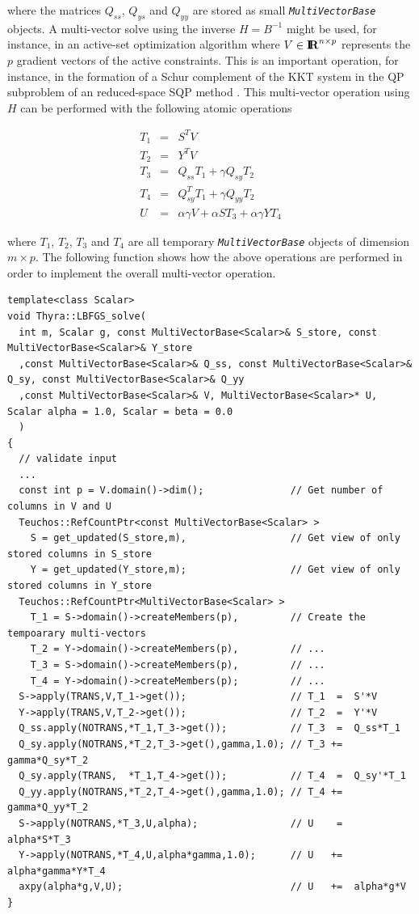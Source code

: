 \documentclass[pdf,ps2pdf,11pt]{SANDreport}
\begin{document}
where the matrices $Q_{ss}$, $Q_{ys}$ and $Q_{yy}$ are stored as small
{}\texttt{\textit{Multi\-Vector\-Base}} objects.  A multi-vector solve using
the inverse $H = B^{-1}$ might be used, for instance, in an active-set
optimization algorithm where $V\in\mbox{\textbf{I}}\hspace{-0.6ex}\mbox{\textbf{R}}^{n \times p}$ represents the $p$
gradient vectors of the active constraints.  This is an important
operation, for instance, in the formation of a Schur complement of the
KKT system in the QP subproblem of an reduced-space SQP method
{}\cite{RABartlett_2001}.  This multi-vector operation using $H$ can
be performed with the following atomic operations

\begin{eqnarray*}
T_1 & = & S^T V \\
T_2 & = & Y^T V \\
T_3 & = & Q_{ss} T_1 + \gamma Q_{sy} T_2 \\
T_4 & = & Q_{sy}^T T_1 + \gamma Q_{yy} T_2 \\
U   & = & \alpha \gamma V + \alpha S T_3 + \alpha \gamma Y T_4
\end{eqnarray*}

{}\noindent{}where $T_1$, $T_2$, $T_3$ and $T_4$ are all temporary
{}\texttt{\textit{Multi\-Vector\-Base}} objects of dimension $m \times p$.
The following function shows how the above operations are performed in
order to implement the overall multi-vector operation.

{\scriptsize\begin{verbatim}
template<class Scalar>
void Thyra::LBFGS_solve(
  int m, Scalar g, const MultiVectorBase<Scalar>& S_store, const MultiVectorBase<Scalar>& Y_store
  ,const MultiVectorBase<Scalar>& Q_ss, const MultiVectorBase<Scalar>& Q_sy, const MultiVectorBase<Scalar>& Q_yy
  ,const MultiVectorBase<Scalar>& V, MultiVectorBase<Scalar>* U, Scalar alpha = 1.0, Scalar = beta = 0.0
  )
{
  // validate input
  ...
  const int p = V.domain()->dim();               // Get number of columns in V and U
  Teuchos::RefCountPtr<const MultiVectorBase<Scalar> >
    S = get_updated(S_store,m),                  // Get view of only stored columns in S_store
    Y = get_updated(Y_store,m);                  // Get view of only stored columns in Y_store
  Teuchos::RefCountPtr<MultiVectorBase<Scalar> >
    T_1 = S->domain()->createMembers(p),         // Create the tempoarary multi-vectors
    T_2 = Y->domain()->createMembers(p),         // ...
    T_3 = S->domain()->createMembers(p),         // ...
    T_4 = Y->domain()->createMembers(p);         // ...
  S->apply(TRANS,V,T_1->get());                  // T_1  =  S'*V
  Y->apply(TRANS,V,T_2->get());                  // T_2  =  Y'*V
  Q_ss.apply(NOTRANS,*T_1,T_3->get());           // T_3  =  Q_ss*T_1
  Q_sy.apply(NOTRANS,*T_2,T_3->get(),gamma,1.0); // T_3 +=  gamma*Q_sy*T_2
  Q_sy.apply(TRANS,  *T_1,T_4->get());           // T_4  =  Q_sy'*T_1
  Q_yy.apply(NOTRANS,*T_2,T_4->get(),gamma,1.0); // T_4 +=  gamma*Q_yy*T_2
  S->apply(NOTRANS,*T_3,U,alpha);                // U    =  alpha*S*T_3
  Y->apply(NOTRANS,*T_4,U,alpha*gamma,1.0);      // U   +=  alpha*gamma*Y*T_4
  axpy(alpha*g,V,U);                             // U   +=  alpha*g*V
}
\end{verbatim}}
\end{document}
